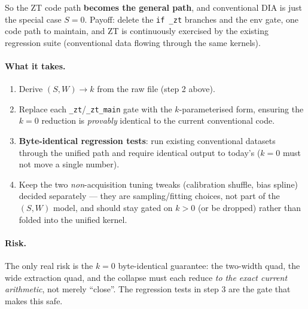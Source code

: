 \documentclass[11pt]{article}
\begin{document}
\noindent So the ZT code path \textbf{becomes the general path}, and conventional DIA
is just the special case $S=0$. Payoff: delete the \texttt{if \_zt} branches and the
env gate, one code path to maintain, and ZT is continuously exercised by the existing
regression suite (conventional data flowing through the same kernels).

\paragraph{What it takes.}
\begin{enumerate}
\item Derive $(S, W)\to k$ from the raw file (step 2 above).
\item Replace each \texttt{\_zt}/\texttt{\_zt\_main} gate with the $k$-parameterised
form, ensuring the $k=0$ reduction is \emph{provably} identical to the current
conventional code.
\item \textbf{Byte-identical regression tests}: run existing conventional datasets
through the unified path and require identical output to today's ($k=0$ must not move
a single number).
\item Keep the two \emph{non}-acquisition tuning tweaks (calibration shuffle, bias
spline) decided separately --- they are sampling/fitting choices, not part of the
$(S,W)$ model, and should stay gated on $k>0$ (or be dropped) rather than folded into
the unified kernel.
\end{enumerate}

\paragraph{Risk.} The only real risk is the $k=0$ byte-identical guarantee: the
two-width quad, the wide extraction quad, and the collapse must each reduce \emph{to
the exact current arithmetic}, not merely ``close''. The regression tests in step 3
are the gate that makes this safe.
\end{document}
